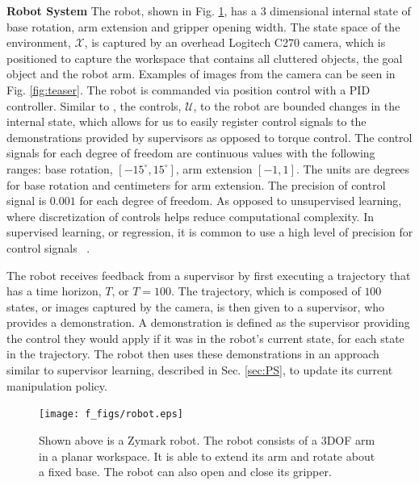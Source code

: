 \documentclass[10pt, conference]{ieeeconf}      %
\begin{document}
\noindent \textbf{Robot System}
The robot, shown in Fig. \ref{fig:robot}, has a 3
dimensional internal state of base rotation, arm extension and gripper opening width. The state space of the environment, $\mathcal{X}$, is captured by  an overhead Logitech C270 camera, which is positioned to capture the workspace that contains all cluttered objects, the goal object and the robot arm. Examples of images from the camera can be seen in Fig. \ref{fig:teaser}. The robot is commanded via position 
control with a  PID controller. Similar to \cite{laskeyshiv}, the controls, $\mathcal{U}$, to the robot are bounded changes in the internal state, which allows for us to easily register control signals to the demonstrations provided by supervisors as opposed to torque control. The control signals for each degree of freedom are continuous values with the following ranges: base rotation, $[-15^\circ,15^\circ]$, arm extension $[-1,1]$. The units are degrees for base rotation and centimeters for arm extension. The precision of control signal is $0.001$ for each degree of freedom. As opposed to unsupervised learning, where discretization of controls helps reduce computational complexity. In supervised learning, or regression, it is common to use a high level of precision for control signals ~\cite{levine2015end, laskeyshiv,kim2013maximum}. 


The robot receives feedback from a supervisor by first executing a trajectory that has a time horizon, $T$, or $T=100$. The trajectory, which is composed of $100$ states, or images captured by the camera, is then given to a supervisor, who provides a demonstration. A demonstration is defined as the supervisor providing  the control they would apply if it was in the robot's current state, for each state in the trajectory. The robot then uses these demonstrations  in an approach similar to supervisor learning,  described in Sec. \ref{sec:PS}, to  update its current manipulation policy.


\begin{figure}[t]
\centering

\texttt{[image: f\_figs/robot.eps]}

\caption{\footnotesize  Shown above is a Zymark robot. The robot consists of a 3DOF arm in a planar workspace. It is able to extend its arm and rotate about a fixed base. The robot can also open and close its gripper.}
\vspace*{-20pt}

\label{fig:robot}
\end{figure}
\end{document}
